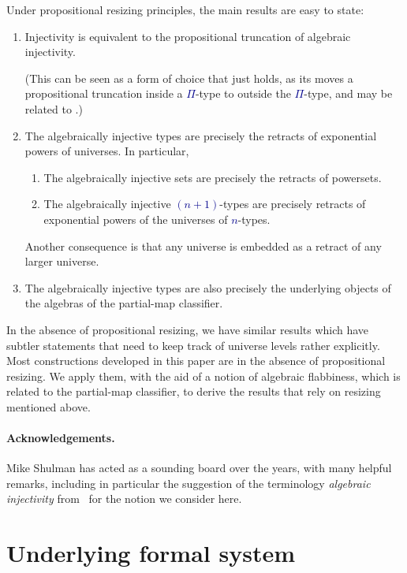 \documentclass[10pt]{article}
\newcommand{\db}{\textcolor{darkblue}}
\newcommand{\m}[1]{\db{$#1$}}
\theoremstyle{definition}
\begin{document}
Under propositional resizing principles, the main results
are easy to state:
\begin{enumerate}
\item Injectivity is equivalent to the propositional truncation of
  algebraic injectivity.

  (This can be seen as a form of choice that
  just holds, as its moves a propositional truncation inside a
  \m{\Pi}-type to outside the \m{\Pi}-type, and may be related to
  \cite{kenney:2011}.)
   \item The algebraically injective types are precisely the retracts of
     exponential powers of universes. In particular,
       \begin{enumerate}
       \item The algebraically injective sets are precisely the
         retracts of powersets.

       \item The algebraically injective \m{(n+1)}-types are precisely
         retracts of exponential powers of the universes of \m{n}-types.
       \end{enumerate}
     Another consequence is that any universe is embedded as a retract of any
     larger universe.
   \item The algebraically injective types are also precisely the
       underlying objects of the algebras of the partial-map
       classifier.
\end{enumerate}
In the absence of propositional resizing, we have similar results
which have subtler statements that need to keep track of universe
levels rather explicitly.
%
Most constructions developed in this paper are in the absence of
propositional resizing. We apply them, with the aid of a notion of
algebraic flabbiness, which is related to the partial-map classifier,
to derive the results that rely on resizing mentioned above.

\paragraph{Acknowledgements.} Mike Shulman has acted as a sounding
board over the years, with many helpful remarks, including in
particular the suggestion of the terminology \emph{algebraic
  injectivity} from~\cite{bourke:2017} for the notion we consider
here.

\section{Underlying formal system} \label{foundations}
\end{document}
